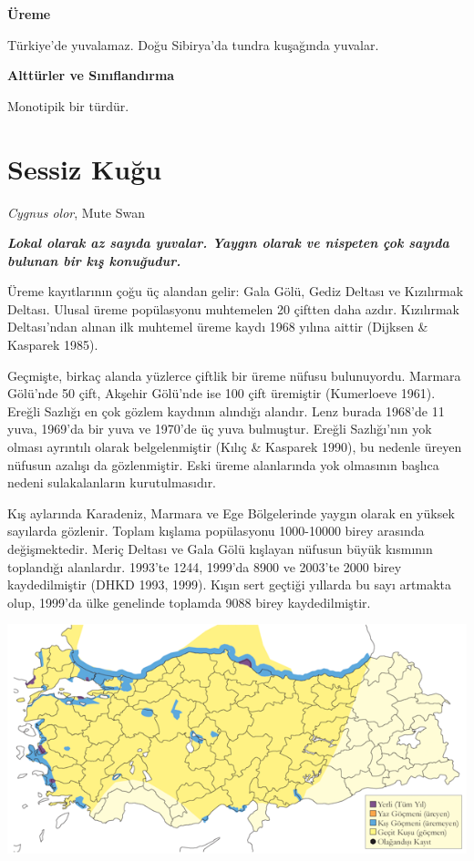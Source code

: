 \documentclass[
  letterpaper,
  DIV=11,
  numbers=noendperiod]{scrreprt}
\begin{document}
\textbf{Üreme}

Türkiye'de yuvalamaz. Doğu Sibirya'da tundra kuşağında yuvalar.

\textbf{Alttürler ve Sınıflandırma}

Monotipik bir türdür.

\section{Sessiz Kuğu}\label{sessiz-kuux11fu}

\emph{Cygnus olor}, Mute Swan

\textbf{\emph{Lokal olarak az sayıda yuvalar. Yaygın olarak ve nispeten
çok sayıda bulunan bir kış konuğudur.}}

Üreme kayıtlarının çoğu üç alandan gelir: Gala Gölü, Gediz Deltası ve
Kızılırmak Deltası. Ulusal üreme popülasyonu muhtemelen 20 çiftten daha
azdır. Kızılırmak Deltası'ndan alınan ilk muhtemel üreme kaydı 1968
yılına aittir (Dijksen \& Kasparek 1985).

Geçmişte, birkaç alanda yüzlerce çiftlik bir üreme nüfusu bulunuyordu.
Marmara Gölü'nde 50 çift, Akşehir Gölü'nde ise 100 çift üremiştir
(Kumerloeve 1961). Ereğli Sazlığı en çok gözlem kaydının alındığı
alandır. Lenz burada 1968'de 11 yuva, 1969'da bir yuva ve 1970'de üç
yuva bulmuştur. Ereğli Sazlığı'nın yok olması ayrıntılı olarak
belgelenmiştir (Kılıç \& Kasparek 1990), bu nedenle üreyen nüfusun
azalışı da gözlenmiştir. Eski üreme alanlarında yok olmasının başlıca
nedeni sulakalanların kurutulmasıdır.

Kış aylarında Karadeniz, Marmara ve Ege Bölgelerinde yaygın olarak en
yüksek sayılarda gözlenir. Toplam kışlama popülasyonu 1000-10000 birey
arasında değişmektedir. Meriç Deltası ve Gala Gölü kışlayan nüfusun
büyük kısmının toplandığı alanlardır. 1993'te 1244, 1999'da 8900 ve
2003'te 2000 birey kaydedilmiştir (DHKD 1993, 1999). Kışın sert geçtiği
yıllarda bu sayı artmakta olup, 1999'da ülke genelinde toplamda 9088
birey kaydedilmiştir.

\includegraphics{images/harita_Page_008.png}
\end{document}
